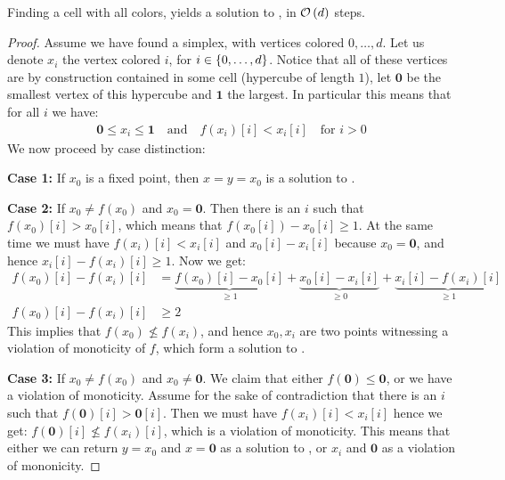 \begin{claim}
    Finding a cell with all colors, yields a solution to \Tarskistar, in $\mathcal{O}\left(d\right)$ steps.
\end{claim}
\begin{proof}
    Assume we have found a simplex, with vertices colored $0, \dots, d$. Let us denote $x_i$ the vertex colored $i$, for $i \in \left\{0, \dots, d\right\}$. Notice that all of these vertices are by construction contained in some cell (hypercube of length $1$), let $\mathbf{0}$ be the smallest vertex of this hypercube and $\mathbf{1}$ the largest. In particular this means that for all $i$ we have:
    \begin{align*}
        \mathbf{0} \leq x_i \leq \mathbf{1} \quad \text{and} \quad f(x_i)[i] < x_i[i] \quad \text{for $i > 0$}
    \end{align*}
    We now proceed by case distinction:

    \textbf{Case 1:} If $x_0$ is a fixed point, then $x = y = x_0$ is a solution to \Tarskistar.

    \textbf{Case 2:} If $x_0 \neq f(x_0)$ and $x_0 = \mathbf{0}$. Then there is an $i$ such that $f(x_0)[i] > x_0[i]$, which means that $f(x_0[i]) - x_0[i] \geq 1$. At the same time we must have $f(x_i)[i] < x_i[i]$ and $x_0[i] - x_i[i]$ because $x_0 = \mathbf{0}$, and hence $x_i[i] - f(x_i)[i] \geq 1$. Now we get:
    \begin{align*}
        f(x_0)[i] - f(x_i)[i] & = \underbrace{f(x_0)[i] - x_0[i]}_{\geq 1} + \underbrace{x_0[i] - x_i[i]}_{\geq 0} + \underbrace{x_i[i] - f(x_i)[i]}_{\geq 1} \\
        f(x_0)[i] - f(x_i)[i] & \geq 2
    \end{align*}
    This implies that $f(x_0) \not \leq f(x_i)$, and hence $x_0, x_i$ are two points witnessing a violation of monoticity of $f$, which form a solution to \Tarskistar.

    \textbf{Case 3:} If $x_0 \neq f(x_0)$ and $x_0 \neq \mathbf{0}$. We claim that either $f(\mathbf{0}) \leq \mathbf{0}$, or we have a violation of monoticity. Assume for the sake of contradiction that there is an $i$ such that $f(\mathbf{0})[i] > \mathbf{0}[i]$. Then we must have $f(x_i)[i] < x_i[i]$ hence we get: $f(\mathbf{0})[i] \not\leq f(x_i)[i]$, which is a violation of monoticity. This means that either we can return $y = x_0$ and $x = \mathbf{0}$ as a solution to \Tarskistar, or $x_i$ and $\mathbf{0}$ as a violation of mononicity.
\end{proof}
